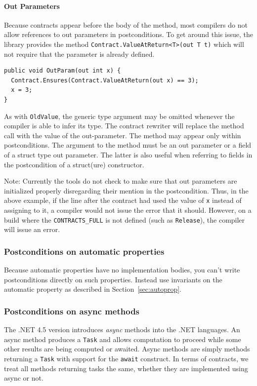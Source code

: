 \documentclass{article}
\newcommand{\code}[1]{\lstinline{#1}}
\begin{document}
\paragraph{Out Parameters}  Because contracts appear
before the body of the method, most compilers do not allow references
to out parameters in postconditions. To get around this issue, the
library provides the method \code{Contract.ValueAtReturn<T>(out T
t)} which will not require that the parameter is already defined.
\begin{lstlisting}
public void OutParam(out int x) {
  Contract.Ensures(Contract.ValueAtReturn(out x) == 3);
  x = 3; 
}
\end{lstlisting}
As with \code{OldValue}, the generic type argument may be omitted whenever
the compiler is able to infer its type. The contract rewriter will
replace the method call with the value of the out-parameter. The method may
appear only within postconditions. The argument to the method must be
an out parameter or a field of a struct type out parameter. The latter
is also useful when referring to fields in the postcondition of a
struct(ure) constructor.

Note: Currently the tools do not check to make sure that out
parameters are initialized properly disregarding their mention in the
postcondition. Thus, in the above example, if the line after the
contract had used the value of \code{x} instead of assigning to it, a
compiler would not issue the error that it should. However, on a build
where the \code{CONTRACTS_FULL} is not defined (such as
\code{Release}), the compiler will issue an error.

\subsubsection{Postconditions on automatic properties}
Because automatic properties have no implementation bodies, you can't
write postconditions directly on such properties. Instead use
invariants on the automatic property as described in
Section~\ref{sec:autoprop}.

\subsubsection{Postconditions on async methods}
\label{sec:async}
The .NET 4.5 version introduces \emph{async} methods into the .NET
languages. An async method produces a \code{Task} and allows
computation to proceed while some other results are being computed or
awaited. Async methods are simply methods returning a \code{Task} with
support for the \code{await} construct. In terms of contracts, we
treat all methods returning tasks the same, whether they are
implemented using async or not.
\end{document}
